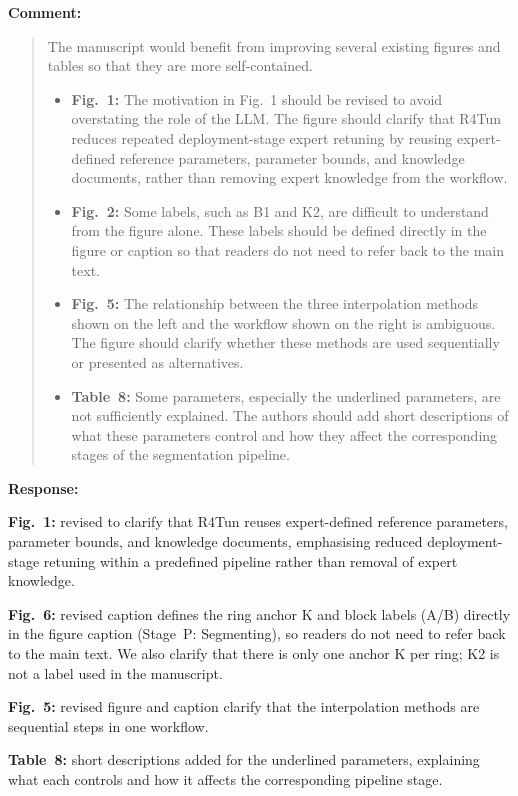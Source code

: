 \documentclass[11pt,a4paper]{article}
\newcommand{\MSCriticalParamsTable}{Table~8}
\newenvironment{commentblock}{%
  \par\smallskip\noindent\textbf{Comment:}\par
  \begin{quote}\itshape\color{black}
}{%
  \end{quote}\smallskip
}
\newenvironment{responseblock}{%
  \par\smallskip\noindent\textbf{Response:}\par
  \begingroup\color{responsegreen}
}{%
  \endgroup\smallskip
}
\begin{document}
\begin{commentblock}
The manuscript would benefit from improving several existing figures and tables so that they are more self-contained.
\begin{itemize}[nosep]
  \item \textbf{Fig.~1:} The motivation in Fig.~1 should be revised to avoid overstating the role of the LLM. The figure should clarify that R4Tun reduces repeated deployment-stage expert retuning by reusing expert-defined reference parameters, parameter bounds, and knowledge documents, rather than removing expert knowledge from the workflow.
  \item \textbf{Fig.~2:} Some labels, such as B1 and K2, are difficult to understand from the figure alone. These labels should be defined directly in the figure or caption so that readers do not need to refer back to the main text.
  \item \textbf{Fig.~5:} The relationship between the three interpolation methods shown on the left and the workflow shown on the right is ambiguous. The figure should clarify whether these methods are used sequentially or presented as alternatives.
  \item \textbf{\MSCriticalParamsTable:} Some parameters, especially the underlined parameters, are not sufficiently explained. The authors should add short descriptions of what these parameters control and how they affect the corresponding stages of the segmentation pipeline.
\end{itemize}
\end{commentblock}
\begin{responseblock}
\textbf{Fig.~1:} revised to clarify that R4Tun reuses expert-defined reference parameters, parameter bounds, and knowledge documents, emphasising reduced deployment-stage retuning within a predefined pipeline rather than removal of expert knowledge.

\textbf{Fig.~6:} revised caption defines the ring anchor K and block labels (A/B) directly in the figure caption (Stage~P: Segmenting), so readers do not need to refer back to the main text. We also clarify that there is only one anchor K per ring; K2 is not a label used in the manuscript.

\textbf{Fig.~5:} revised figure and caption clarify that the interpolation methods are sequential steps in one workflow.

\textbf{\MSCriticalParamsTable:} short descriptions added for the underlined parameters, explaining what each controls and how it affects the corresponding pipeline stage.
\end{responseblock}
\end{document}
